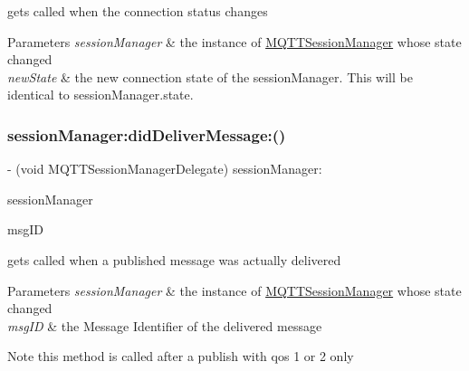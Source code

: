 gets called when the connection status changes 
\begin{DoxyParams}{Parameters}
{\em session\+Manager} & the instance of \hyperlink{interface_m_q_t_t_session_manager}{M\+Q\+T\+T\+Session\+Manager} whose state changed \\
\hline
{\em new\+State} & the new connection state of the session\+Manager. This will be identical to {\ttfamily session\+Manager.\+state}. \\
\hline
\end{DoxyParams}
\mbox{\label{protocol_m_q_t_t_session_manager_delegate_01-p_ac76a8d6565abe56028b22a77f75d0af5}} 
\subsubsection{\texorpdfstring{session\+Manager\+:did\+Deliver\+Message\+:()}{sessionManager:didDeliverMessage:()}}
{\footnotesize\ttfamily -\/ (void M\+Q\+T\+T\+Session\+Manager\+Delegate) session\+Manager\+: \begin{DoxyParamCaption}\item[{(\hyperlink{interface_m_q_t_t_session_manager}{M\+Q\+T\+T\+Session\+Manager} $\ast$)}]{session\+Manager }\item[{didDeliverMessage:(U\+Int16)}]{msg\+ID }\end{DoxyParamCaption}\hspace{0.3cm}{\ttfamily [optional]}}

gets called when a published message was actually delivered 
\begin{DoxyParams}{Parameters}
{\em session\+Manager} & the instance of \hyperlink{interface_m_q_t_t_session_manager}{M\+Q\+T\+T\+Session\+Manager} whose state changed \\
\hline
{\em msg\+ID} & the Message Identifier of the delivered message \\
\hline
\end{DoxyParams}
\begin{DoxyNote}{Note}
this method is called after a publish with qos 1 or 2 only 
\end{DoxyNote}
\mbox{\label{protocol_m_q_t_t_session_manager_delegate_01-p_aeb6f07319f8362c30f914cf02e1843c8}} 
